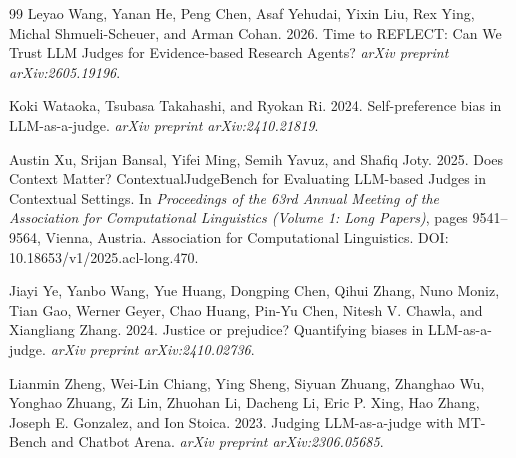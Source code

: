\begin{thebibliography}{99}
Leyao Wang, Yanan He, Peng Chen, Asaf Yehudai, Yixin Liu, Rex Ying, Michal Shmueli-Scheuer, and Arman Cohan. 2026.
\newblock Time to REFLECT: Can We Trust LLM Judges for Evidence-based Research Agents?
\newblock \emph{arXiv preprint arXiv:2605.19196}.

Koki Wataoka, Tsubasa Takahashi, and Ryokan Ri. 2024.
\newblock Self-preference bias in LLM-as-a-judge.
\newblock \emph{arXiv preprint arXiv:2410.21819}.

Austin Xu, Srijan Bansal, Yifei Ming, Semih Yavuz, and Shafiq Joty. 2025.
\newblock Does Context Matter? ContextualJudgeBench for Evaluating LLM-based Judges in Contextual Settings.
\newblock In \emph{Proceedings of the 63rd Annual Meeting of the Association for Computational Linguistics (Volume 1: Long Papers)}, pages 9541--9564, Vienna, Austria. Association for Computational Linguistics. DOI: 10.18653/v1/2025.acl-long.470.

Jiayi Ye, Yanbo Wang, Yue Huang, Dongping Chen, Qihui Zhang, Nuno Moniz, Tian Gao, Werner Geyer, Chao Huang, Pin-Yu Chen, Nitesh V. Chawla, and Xiangliang Zhang. 2024.
\newblock Justice or prejudice? Quantifying biases in LLM-as-a-judge.
\newblock \emph{arXiv preprint arXiv:2410.02736}.

Lianmin Zheng, Wei-Lin Chiang, Ying Sheng, Siyuan Zhuang, Zhanghao Wu, Yonghao Zhuang, Zi Lin, Zhuohan Li, Dacheng Li, Eric P. Xing, Hao Zhang, Joseph E. Gonzalez, and Ion Stoica. 2023.
\newblock Judging LLM-as-a-judge with MT-Bench and Chatbot Arena.
\newblock \emph{arXiv preprint arXiv:2306.05685}.

\end{thebibliography}
